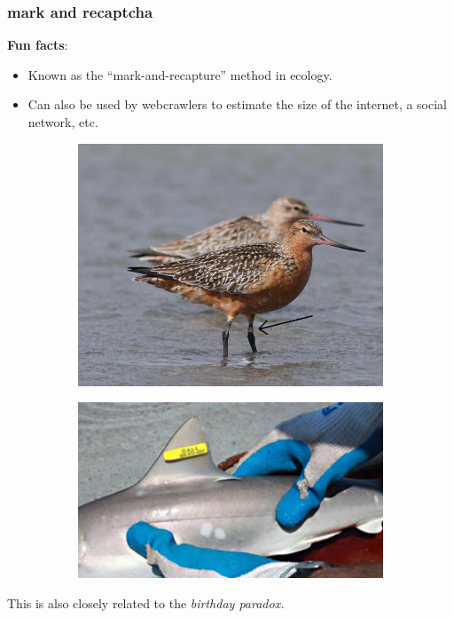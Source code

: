 \documentclass[]{beamer}
\begin{document}
	\begin{frame}
		\frametitle{mark and recaptcha}
		\textbf{Fun facts}:
		\begin{itemize}
			\item Known as the ``mark-and-recapture'' method in ecology.
			\item Can also be used by webcrawlers to estimate the size of the internet, a social network, etc. 
		\end{itemize}
		\begin{figure}
			\begin{subfigure}[t]{0.4\textwidth}
				\centering
				\includegraphics[width=\textwidth]{bird.jpg}
			\end{subfigure}
			\hfill
			\begin{subfigure}[t]{0.4\textwidth}
				\centering
				\includegraphics[width=\textwidth]{fish.jpg}
			\end{subfigure}
		\end{figure}
		This is also closely related to the \emph{birthday paradox.}
	\end{frame}
	
\end{document}
